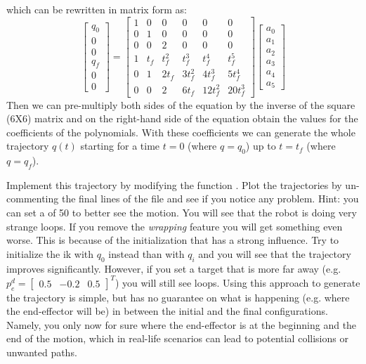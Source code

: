 \documentclass[11pt]{article}
\newcommand{\mat}[1]{\ensuremath{\begin{bmatrix}#1\end{bmatrix}}}	%
\begin{document}
%
which can be rewritten in matrix form as: 
\begin{equation*}
	\begin{bmatrix}
		q_0 \\
		0 \\
		0 \\
		q_f \\
		0 \\
		0
	\end{bmatrix} =
	\begin{bmatrix}
		1 & 0   & 0     &       0 &        0 &     0 \\
		0 &   1 &     0 &       0 &        0 &     0 \\
		0 &   0 &     2 &       0 &        0 &     0 \\
		1 & t_f & t_f^2 &   t_f^3 &    t_f^4 & t_f^5 \\
		0 &   1 & 2 t_f & 3 t_f^2 &  4 t_f^3 & 5 t_f^4 \\
		0 &   0 &     2 &   6 t_f & 12 t_f^2 & 20 t_f^3
	\end{bmatrix}
	\begin{bmatrix}
		a_0 \\
		a_1 \\ 
		a_2 \\
		a_3 \\
		a_4 \\
		a_5
	\end{bmatrix}
\end{equation*}
Then we can pre-multiply both sides of the equation by the inverse of the square (6X6) matrix and on the right-hand side of the equation obtain the values for the coefficients of the polynomials.
With these coefficients we can generate the whole trajectory $q(t)$ starting for a time $t=0$ (where $q = q_0$) up to $t=t_f$ (where  $q = q_f$).

Implement this trajectory by modifying the function . Plot the trajectories by un-commenting the final lines of the file  and see if you notice any problem. Hint: you can set a  of 50 to better see the motion. You will see that the robot is doing very strange loops. If you remove the \textit{wrapping} feature you will get something even worse. This is because of the initialization that has a strong influence. Try to initialize the ik with $q_0$ instead  than with $q_i$ and you will see that the trajectory improves significantly. However, if you set a target that is more far away (e.g.  $p^d_e =\mat{0.5 & -0.2 & 0.5}^T$) you will still see loops. 
Using this approach to generate the trajectory is simple, but has no guarantee on what is happening (e.g. where the end-effector will be) in between the initial and the final configurations.
Namely, you only now for sure where the end-effector is at the beginning and the end of the motion, which in real-life scenarios can lead to potential collisions or unwanted paths.
\end{document}
